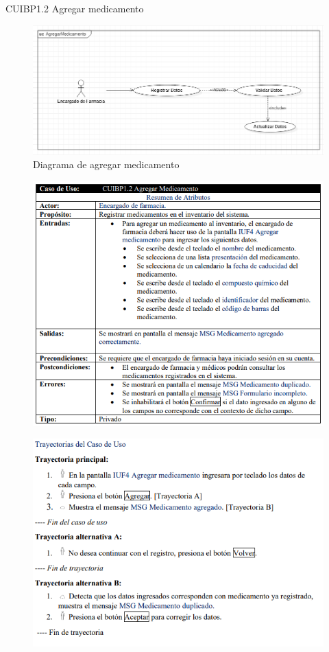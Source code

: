 \documentclass[12pt,letterpaper]{article}
\begin{document}
            \newpage
            CUIBP1.2 Agregar medicamento 
            \begin{figure}[H]
                \centering
                \includegraphics [scale=0.5]{casosUso/agregarMedicamento}
                \caption{Diagrama de agregar medicamento}
            \end{figure}
            \begin{figure}[H]
                \centering
                \includegraphics [scale=0.75]{specs/specAgregarMedicamento}
            \end{figure}
            \begin{figure}[H]
                \centering
                \includegraphics [scale=0.9]{specs/trayAgregarMedicamento}
            \end{figure}
\end{document}
